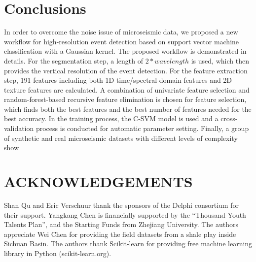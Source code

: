 \section{Conclusions}
In order to overcome the noise issue of microseismic data, we proposed a new workflow for high-resolution event detection based on support vector machine classification with a Gaussian kernel. The proposed workflow is demonstrated in details. For the segmentation step, a length of $2*wavelength$ is used, which then provides the vertical resolution of the event detection. For the feature extraction step, 191 features including both 1D time/spectral-domain features and 2D texture features are calculated. A combination of univariate feature selection and random-forest-based recursive feature elimination is chosen for feature selection, which finds both the best features and the best number of features needed for the best accuracy. In the training process, the C-SVM model is used and a cross-validation process is conducted for  automatic parameter setting. Finally, a group of synthetic and real microseismic datasets with different levels of complexity show

\section{ACKNOWLEDGEMENTS}
Shan Qu and Eric Verschuur thank the sponsors of the Delphi consortium for their support. Yangkang Chen is financially supported by the “Thousand Youth Talents Plan”, and the Starting Funds from Zhejiang University. The authors appreciate Wei Chen for providing the field datasets from a shale play inside Sichuan Basin. The authors thank Scikit-learn for providing free machine learning library in Python (scikit-learn.org). 

